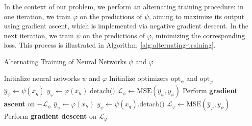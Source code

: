 In the context of our problem, we perform an alternating training procedure: in one iteration, we train $\varphi$ on the predictions of $\psi$, aiming to maximize its output using gradient ascent, which is implemented via negative gradient descent. In the next iteration, we train $\psi$ on the predictions of $\varphi$, minimizing the corresponding loss.
This process is illustrated in Algorithm~\ref{alg:alternating-training}.



\begin{algorithm}[H]
\caption{Alternating Training of Neural Networks \(\psi\) and \(\varphi\)}
\label{alg:alternating-training}
\begin{algorithmic}[1]
\State Initialize neural networks \(\psi\) and \(\varphi\)
\State Initialize optimizers \(\text{opt}_\psi\) and \(\text{opt}_\varphi\)
         
            \State \(\hat{y}_\psi \gets \psi(x_g)\) 
            \State \(y_\varphi \gets \varphi(x_h).\text{detach()}\)
            \State $\mathcal{L}_\psi \gets \text{MSE}(\hat{y}_\psi, y_\varphi)$ 
            \State Perform \textbf{gradient ascent} on \(-\mathcal{L}_\psi\)
        \Else {}
            \State\(\hat{y}_\varphi \gets \varphi(x_h)\)
            \State \(y_\psi \gets \psi(x_g).\text{detach()}\) 
            \State\(\mathcal{L}_\varphi \gets \text{MSE}(\hat{y}_\varphi, y_\psi)\)
            \State Perform \textbf{gradient descent} on \(\mathcal{L}_\varphi\)
        \EndIf
    \EndFor
\EndFor
\end{algorithmic}
\end{algorithm}

